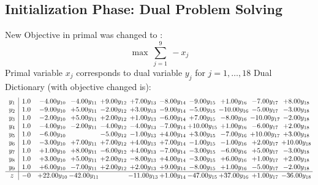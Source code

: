 \documentclass[9pt]{article}
\begin{document}
\subsection{Initialization Phase: Dual Problem Solving}
New Objective in primal was changed to : \[ \max\ \sum_{j=1}^{9}\ - x_j \] 
Primal variable $x_j$ corresponds to dual variable $y_j$ for $j = 1,\ldots,18$
Dual Dictionary (with objective changed is): 
\[\begin{array}{c| c c@{\hskip 2pt} c@{\hskip 2pt} c@{\hskip 2pt} c@{\hskip 2pt} c@{\hskip 2pt} c@{\hskip 2pt} c@{\hskip 2pt} c@{\hskip 2pt} c@{\hskip 2pt} }
 y_{1}   &  1.0 & -4.00 y_{10} & -4.00 y_{11} & +  9.00 y_{12} & +  7.00 y_{13} & -8.00 y_{14} & -9.00 y_{15} & +  1.00 y_{16} & -7.00 y_{17} & +  8.00 y_{18}\\
 y_{2}   &  1.0 & -9.00 y_{10} & +  5.00 y_{11} & -2.00 y_{12} & +  3.00 y_{13} & -9.00 y_{14} & -5.00 y_{15} & -10.00 y_{16} & -5.00 y_{17} & -3.00 y_{18}\\
 y_{3}   &  1.0 & -2.00 y_{10} & +  5.00 y_{11} & +  2.00 y_{12} & +  1.00 y_{13} & -6.00 y_{14} & +  7.00 y_{15} & -8.00 y_{16} & -10.00 y_{17} & -2.00 y_{18}\\
 y_{4}   &  1.0 & -4.00 y_{10} & -2.00 y_{11} & -4.00 y_{12} & -4.00 y_{13} & -7.00 y_{14} & + 10.00 y_{15} & +  1.00 y_{16} & -6.00 y_{17} & +  2.00 y_{18}\\
 y_{5}   &  1.0 & -6.00 y_{10} &   & -5.00 y_{12} & -1.00 y_{13} & +  4.00 y_{14} & +  3.00 y_{15} & -7.00 y_{16} & + 10.00 y_{17} & +  3.00 y_{18}\\
 y_{6}   &  1.0 & -3.00 y_{10} & +  7.00 y_{11} & +  7.00 y_{12} & +  4.00 y_{13} & +  7.00 y_{14} & -1.00 y_{15} & -1.00 y_{16} & +  2.00 y_{17} & + 10.00 y_{18}\\
 y_{7}   &  1.0 & +  1.00 y_{10} & +  8.00 y_{11} & -6.00 y_{12} & +  4.00 y_{13} & -7.00 y_{14} & -3.00 y_{15} & -6.00 y_{16} & +  5.00 y_{17} & -3.00 y_{18}\\
 y_{8}   &  1.0 & +  3.00 y_{10} & +  5.00 y_{11} & +  2.00 y_{12} & -8.00 y_{13} & +  4.00 y_{14} & -3.00 y_{15} & +  6.00 y_{16} & +  1.00 y_{17} & +  2.00 y_{18}\\
 y_{9}   &  1.0 & +  6.00 y_{10} & -7.00 y_{11} & +  2.00 y_{12} & +  2.00 y_{13} & +  9.00 y_{14} & -8.00 y_{15} & +  1.00 y_{16} & -5.00 y_{17} & -2.00 y_{18}\\
\hline
z    &  -0 & + 22.00 y_{10} & -42.00 y_{11} &   & -11.00 y_{13} & +  1.00 y_{14} & -47.00 y_{15} & + 37.00 y_{16} & +  1.00 y_{17} & -36.00 y_{18}\\
\end{array}\]
\end{document}
